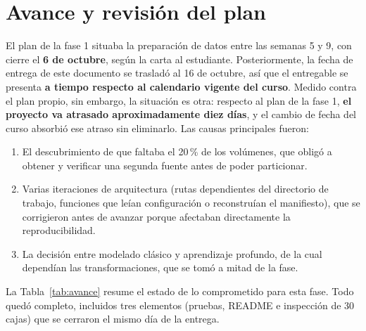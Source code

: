 \documentclass[12pt,letterpaper]{article}
\begin{document}
\section{Avance y revisión del plan}\label{sec:plan}

El plan de la fase 1 situaba la preparación de datos entre las semanas 5 y 9, con cierre el \textbf{6 de octubre}, según la carta al estudiante. Posteriormente, la fecha de entrega de este documento se trasladó al 16 de octubre, así que el entregable se presenta \textbf{a tiempo respecto al calendario vigente del curso}. Medido contra el plan propio, sin embargo, la situación es otra: respecto al plan de la fase 1, \textbf{el proyecto va atrasado aproximadamente diez días}, y el cambio de fecha del curso absorbió ese atraso sin eliminarlo. Las causas principales fueron:

\begin{enumerate}[leftmargin=*]
  \item El descubrimiento de que faltaba el 20\,\% de los volúmenes, que obligó a obtener y verificar una segunda fuente antes de poder particionar.
  \item Varias iteraciones de arquitectura (rutas dependientes del directorio de trabajo, funciones que leían configuración o reconstruían el manifiesto), que se corrigieron antes de avanzar porque afectaban directamente la reproducibilidad.
  \item La decisión entre modelado clásico y aprendizaje profundo, de la cual dependían las transformaciones, que se tomó a mitad de la fase.
\end{enumerate}

\noindent La Tabla~\ref{tab:avance} resume el estado de lo comprometido para esta fase. Todo quedó completo, incluidos tres elementos (pruebas, README e inspección de 30 cajas) que se cerraron el mismo día de la entrega.
\end{document}
